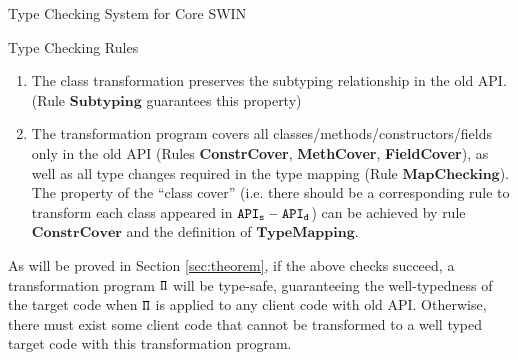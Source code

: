 \begin{section}{Type Checking System for Core SWIN}
\begin{subsection}{Type Checking Rules}
\begin{enumerate}
\item The class transformation preserves the subtyping relationship in the old
  API. (Rule $\mathbf{Subtyping}$ guarantees this property)

\item The transformation program covers all classes/methods/constructors/fields only
  in the old API (Rules \textbf{ConstrCover}, \textbf{MethCover}, \textbf{FieldCover}), as well as all type changes required in the type
  mapping (Rule $\mathbf{MapChecking}$). 
  The property of the ``class cover'' (i.e. there should be a corresponding rule to transform each class appeared in $\tt API_s-API_d$) 
  can be achieved by rule $\mathbf{ConstrCover}$ and the definition of $\mathbf{TypeMapping}$. 
\end{enumerate}

As will be proved in Section \ref{sec:theorem}, if the above checks
succeed, a transformation program $\tt\Pi$ will be type-safe, guaranteeing the
well-typedness of the target code when $\tt\Pi$ is applied to any
client code with old API. Otherwise, there must exist some client code
that cannot be transformed to a well typed target code with this
transformation program.



\end{subsection}
\end{section}
